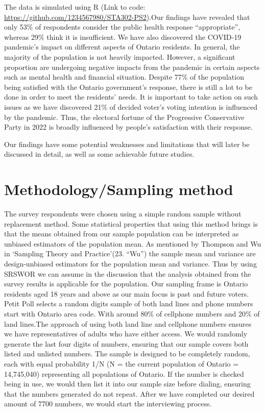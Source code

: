 \documentclass[
]{article}
\begin{document}
The data is simulated using R (Link to code:
\url{https://github.com/1234567980/STA302-PS2}).Our findings have
revealed that only 53\% of respondents consider the public health
response ``appropriate'', whereas 29\% think it is insufficient. We have
also discovered the COVID-19 pandemic's impact on different aspects of
Ontario residents. In general, the majority of the population is not
heavily impacted. However, a significant proportion are undergoing
negative impacts from the pandemic in certain aspects such as mental
health and financial situation. Despite 77\% of the population being
satisfied with the Ontario government's response, there is still a lot
to be done in order to meet the residents' needs. It is important to
take action on such issues as we have discovered 21\% of decided voter's
voting intention is influenced by the pandemic. Thus, the electoral
fortune of the Progressive Conservative Party in 2022 is broadly
influenced by people's satisfaction with their response.

Our findings have some potential weaknesses and limitations that will
later be discussed in detail, as well as some achievable future studies.

\newpage

\hypertarget{methodologysampling-method}{%
\section{Methodology/Sampling method}\label{methodologysampling-method}}

The survey respondents were chosen using a simple random sample without
replacement method. Some statistical properties that using this method
brings is that the means obtained from our sample population can be
interpreted as unbiased estimators of the population mean. As mentioned
by Thompson and Wu in `Sampling Theory and Practice'(23. ``Wu'') the
sample mean and variance are design-unbiased estimators for the
population mean and variance. Thus by using SRSWOR we can assume in the
discussion that the analysis obtained from the survey results is
applicable for the population. Our sampling frame is Ontario residents
aged 18 years and above as our main focus is past and future voters.
Petit Poll selects a random digits sample of both land lines and phone
numbers start with Ontario area code. With around 80\% of cellphone
numbers and 20\% of land lines.The approach of using both land line and
cellphone numbers ensures we have representatives of adults who have
either access. We would randomly generate the last four digits of
numbers, ensuring that our sample covers both listed and unlisted
numbers. The sample is designed to be completely random, each with equal
probability 1/N (N = the current population of Ontario = 14,745,040)
representing all populations of Ontario. If the number is checked being
in use, we would then list it into our sample size before dialing,
ensuring that the numbers generated do not repeat. After we have
completed our desired amount of 7700 numbers, we would start the
interviewing process.
\end{document}
